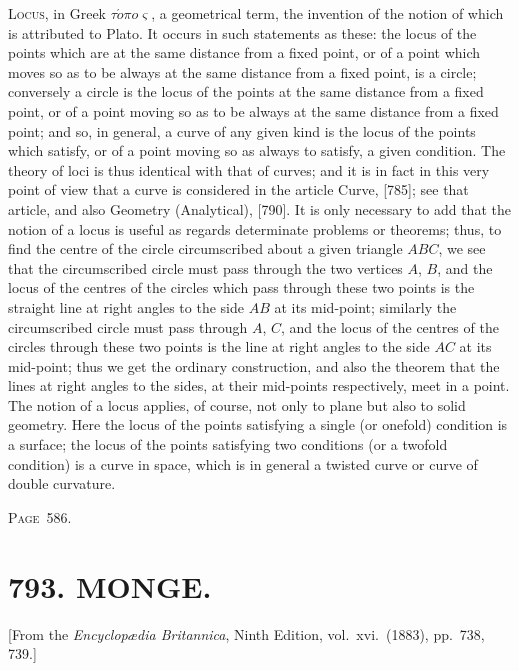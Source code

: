 \documentclass[11pt,a4paper]{article}
\theoremstyle{definition}
\begin{document}
\textsc{Locus}, in Greek $\tau\acute{o}\pi o\varsigma$, a geometrical term, the invention of the notion of which is attributed to Plato. It occurs in such statements as these: the locus of the points which are at the same distance from a fixed point, or of a point which moves so as to be always at the same distance from a fixed point, is a circle; conversely a circle is the locus of the points at the same distance from a fixed point, or of a point moving so as to be always at the same distance from a fixed point; and so, in general, a curve of any given kind is the locus of the points which satisfy, or of a point moving so as always to satisfy, a given condition. The theory of loci is thus identical with that of curves; and it is in fact in this very point of view that a curve is considered in the article Curve, [785]; see that article, and also Geometry (Analytical), [790]. It is only necessary to add that the notion of a locus is useful as regards determinate problems or theorems; thus, to find the centre of the circle circumscribed about a given triangle $ABC$, we see that the circumscribed circle must pass through the two vertices $A$, $B$, and the locus of the centres of the circles which pass through these two points is the straight line at right angles to the side $AB$ at its mid-point; similarly the circumscribed circle must pass through $A$, $C$, and the locus of the centres of the circles through these two points is the line at right angles to the side $AC$ at its mid-point; thus we get the ordinary construction, and also the theorem that the lines at right angles to the sides, at their mid-points respectively, meet in a point. The notion of a locus applies, of course, not only to plane but also to solid geometry. Here the locus of the points satisfying a single (or onefold) condition is a surface; the locus of the points satisfying two conditions (or a twofold condition) is a curve in space, which is in general a twisted curve or curve of double curvature.

\newpage
\noindent\textsc{Page~586.}

\section*{793. MONGE.}

\begin{flushright}
\small[From the \textit{Encyclop{\ae}dia Britannica}, Ninth Edition, vol.~xvi.~(1883), pp.~738, 739.]
\end{flushright}
\end{document}
